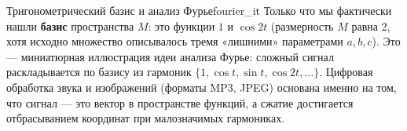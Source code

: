 \documentclass[12pt,a4paper]{article}
\begin{document}
\begin{remarkIT}{Тригонометрический базис и анализ Фурье}{fourier_it}
Только что мы фактически нашли \textbf{базис} пространства $M$: это
функции $1$ и $\cos 2t$ (размерность $M$ равна 2, хотя исходно
множество описывалось тремя «лишними» параметрами $a, b, c$). Это —
миниатюрная иллюстрация идеи анализа Фурье: сложный сигнал
раскладывается по базису из гармоник $\{1, \cos t, \sin t, \cos 2t,
\dots\}$. Цифровая обработка звука и изображений (форматы MP3, JPEG)
основана именно на том, что сигнал — это вектор в пространстве функций,
а сжатие достигается отбрасыванием координат при малозначимых
гармониках.
\end{remarkIT}
\end{document}
